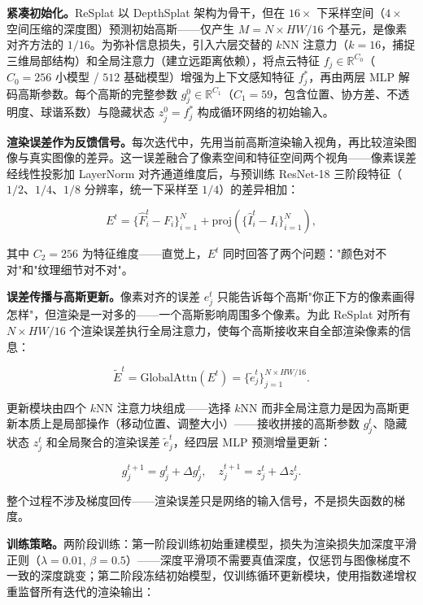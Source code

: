 \textbf{紧凑初始化。}ReSplat 以 DepthSplat 架构为骨干，但在 $16\times$ 下采样空间（$4\times$ 空间压缩的深度图）预测初始高斯——仅产生 $M = N \times HW/16$ 个基元，是像素对齐方法的 $1/16$。为弥补信息损失，引入六层交替的 $k$NN 注意力（$k=16$，捕捉三维局部结构）和全局注意力（建立远距离依赖），将点云特征 $f_j \in \mathbb{R}^{C_0}$（$C_0=256$ 小模型 / $512$ 基础模型）增强为上下文感知特征 $f_j^*$，再由两层 MLP 解码高斯参数。每个高斯的完整参数 $g_j^0 \in \mathbb{R}^{C_1}$（$C_1=59$，包含位置、协方差、不透明度、球谐系数）与隐藏状态 $z_j^0 = f_j^*$ 构成循环网络的初始输入。

\textbf{渲染误差作为反馈信号。}每次迭代中，先用当前高斯渲染输入视角，再比较渲染图像与真实图像的差异。这一误差融合了像素空间和特征空间两个视角——像素误差经线性投影加 LayerNorm 对齐通道维度后，与预训练 ResNet-18 三阶段特征（$1/2$、$1/4$、$1/8$ 分辨率，统一下采样至 $1/4$）的差异相加：

\begin{equation}
E^t = \{ \hat{F}_i^t - F_i \}_{i=1}^N + \mathrm{proj}(\{ \hat{I}_i^t - I_i \}_{i=1}^N),
\end{equation}

其中 $C_2=256$ 为特征维度——直觉上，$E^t$ 同时回答了两个问题："颜色对不对"和"纹理细节对不对"。

\textbf{误差传播与高斯更新。}像素对齐的误差 $e_j^t$ 只能告诉每个高斯"你正下方的像素画得怎样"，但渲染是一对多的——一个高斯影响周围多个像素。为此 ReSplat 对所有 $N \times HW/16$ 个渲染误差执行全局注意力，使每个高斯接收来自全部渲染像素的信息：

\begin{equation}
\tilde{E}^t = \mathrm{GlobalAttn}(E^t) = \{\tilde{e}_j^t\}_{j=1}^{N \times HW/16}.
\end{equation}

更新模块由四个 $k$NN 注意力块组成——选择 $k$NN 而非全局注意力是因为高斯更新本质上是局部操作（移动位置、调整大小）——接收拼接的高斯参数 $g_j^t$、隐藏状态 $z_j^t$ 和全局聚合的渲染误差 $\tilde{e}_j^t$，经四层 MLP 预测增量更新：

\begin{equation}
g_j^{t+1} = g_j^t + \Delta g_j^t, \quad z_j^{t+1} = z_j^t + \Delta z_j^t.
\end{equation}

整个过程不涉及梯度回传——渲染误差只是网络的输入信号，不是损失函数的梯度。

\textbf{训练策略。}两阶段训练：第一阶段训练初始重建模型，损失为渲染损失加深度平滑正则（$\lambda=0.01$, $\beta=0.5$）——深度平滑项不需要真值深度，仅惩罚与图像梯度不一致的深度跳变；第二阶段冻结初始模型，仅训练循环更新模块，使用指数递增权重监督所有迭代的渲染输出：

